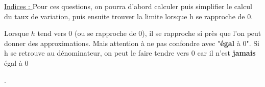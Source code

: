 \documentclass[12pt,a4paper]{exam}
\begin{document}
\vspace{5pt}
\it{\underline{Indices : } Pour ces questions, on pourra d'abord calculer puis simplifier le 
calcul du taux de variation, puis ensuite trouver la limite lorsque h se rapproche de 0.

\vspace{5pt}
Lorsque $h$ tend vers 0 (ou se rapproche de 0), il se rapproche si près que l'on peut donner des approximations.
Mais attention à ne pas confondre avec "\textbf{égal} à 0". Si h se retrouve au dénominateur, 
on peut le faire tendre vers 0 car il n'est \textbf{jamais} égal à 0}.
\end{document}
